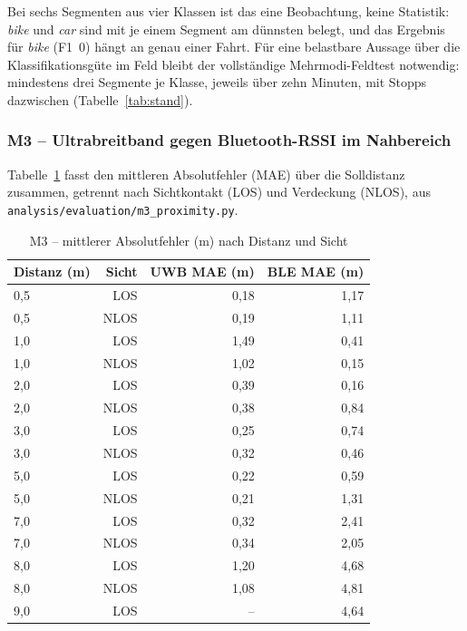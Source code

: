 \documentclass[11pt,a4paper,oneside]{article}
\begin{document}
Bei sechs Segmenten aus vier Klassen ist das eine Beobachtung, keine
Statistik: \emph{bike} und \emph{car} sind mit je einem Segment am dünnsten
belegt, und das Ergebnis für \emph{bike} (F1~0) hängt an genau einer
Fahrt. Für eine belastbare Aussage über die Klassifikationsgüte im Feld
bleibt der vollständige Mehrmodi-Feldtest notwendig: mindestens drei
Segmente je Klasse, jeweils über zehn Minuten, mit Stopps dazwischen
(Tabelle~\ref{tab:stand}).

\subsubsection{M3 -- Ultrabreitband gegen Bluetooth-RSSI im Nahbereich}
\label{sec:m3}

Tabelle~\ref{tab:m3} fasst den mittleren Absolutfehler (MAE) über die
Solldistanz zusammen, getrennt nach Sichtkontakt (LOS) und Verdeckung
(NLOS), aus \texttt{analysis/evaluation/m3\_proximity.py}.

\begin{table}[htbp]
\centering
\small
\caption{M3 -- mittlerer Absolutfehler (m) nach Distanz und Sicht}
\label{tab:m3}
\begin{tabularx}{\linewidth}{@{}lrrr@{}}
\toprule
\textbf{Distanz (m)} & \textbf{Sicht} & \textbf{UWB MAE (m)} & \textbf{BLE MAE (m)} \\
\midrule
0{,}5 & LOS  & 0{,}18 & 1{,}17 \\
0{,}5 & NLOS & 0{,}19 & 1{,}11 \\
1{,}0 & LOS  & 1{,}49 & 0{,}41 \\
1{,}0 & NLOS & 1{,}02 & 0{,}15 \\
2{,}0 & LOS  & 0{,}39 & 0{,}16 \\
2{,}0 & NLOS & 0{,}38 & 0{,}84 \\
3{,}0 & LOS  & 0{,}25 & 0{,}74 \\
3{,}0 & NLOS & 0{,}32 & 0{,}46 \\
5{,}0 & LOS  & 0{,}22 & 0{,}59 \\
5{,}0 & NLOS & 0{,}21 & 1{,}31 \\
7{,}0 & LOS  & 0{,}32 & 2{,}41 \\
7{,}0 & NLOS & 0{,}34 & 2{,}05 \\
8{,}0 & LOS  & 1{,}20 & 4{,}68 \\
8{,}0 & NLOS & 1{,}08 & 4{,}81 \\
9{,}0 & LOS  & -- & 4{,}64 \\
\bottomrule
\end{tabularx}
\end{table}
\end{document}
